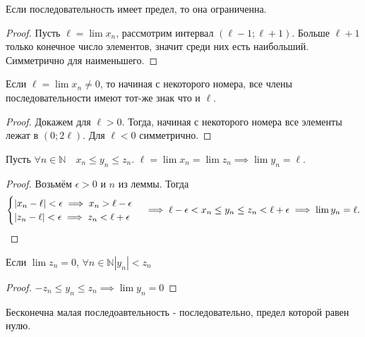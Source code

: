 \documentclass[11pt, oneside]{article}   	%
\begin{document}
        \begin{theorem}
            Если последовательность имеет предел, то она ограниченна.
            \begin{proof}
                Пусть $\ell=\lim x_n$, рассмотрим интервал $\left( \ell-1; \ell+1 \right) $. Больше $\ell+1$ только конечное число элементов, значит среди них есть наибольший. Симметрично для наименьшего.
            \end{proof}
        \end{theorem}
        \begin{theorem}
            Если $\ell=\lim x_n \neq 0$, то начиная с некоторого номера, все члены последовательности имеют тот-же знак что и $\ell$.
             \begin{proof}
                 Докажем для $\ell>0$. Тогда, начиная с некоторого номера все элементы лежат в  $\left( 0; 2\ell \right) $. Для $\ell<0$ симметрично.
            \end{proof}
        \end{theorem}
        \begin{theorem}
            Пусть $\forall{n \in \mathbb{N}}\quad x_n \le y_n \le z_n$. $\ell = \lim x_n = \lim z_n \implies \lim y_n = \ell$.
            \begin{proof}
                Возьмём $\epsilon>0$ и  $n$ из леммы. Тогда
                 \[ 
                    \begin{cases}
                        |x_n-\ell|<\epsilon \implies x_n > \ell-\epsilon\\
                        |z_n-\ell|<\epsilon \implies z_n < \ell+\epsilon
                    \end{cases}
                 \implies \ell - \epsilon < x_n \le y_n \le z_n < \ell + \epsilon \implies \lim y_n = \ell.\qedhere\]    
            \end{proof}
        \end{theorem}
        \begin{tlemma}
            Если $\lim z_n = 0$,  $\forall{n \in \mathbb{N}}|y_n| < z_n$ 
            \begin{proof}
                $-z_n \le y_n \le z_n \implies \lim y_n = 0$
            \end{proof}
        \end{tlemma}
        \begin{definition}
            Бесконечна малая последоавтельность - последовательно, предел которой равен нулю.
        \end{definition}
\end{document}
